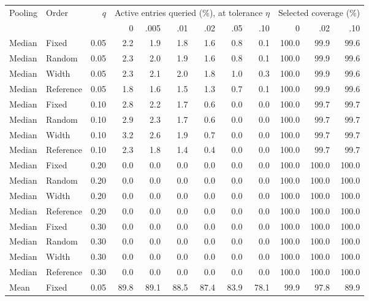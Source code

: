 \begin{table}[t]
\centering\small\setlength{\tabcolsep}{3pt}
\begin{tabular}{llrrrrrrrrrr}
\toprule
Pooling & Order & $q$ & \multicolumn{6}{c}{Active entries queried (\%), at tolerance $\eta$} & \multicolumn{3}{c}{Selected coverage (\%)} \\
\cmidrule(lr){4-9}\cmidrule(lr){10-12}
 & & & 0 & .005 & .01 & .02 & .05 & .10 & 0 & .02 & .10 \\
\midrule
Median & Fixed & 0.05 & 2.2 & 1.9 & 1.8 & 1.6 & 0.8 & 0.1 & 100.0 & 99.9 & 99.6 \\
Median & Random & 0.05 & 2.3 & 2.0 & 1.9 & 1.6 & 0.8 & 0.1 & 100.0 & 99.9 & 99.6 \\
Median & Width & 0.05 & 2.3 & 2.1 & 2.0 & 1.8 & 1.0 & 0.3 & 100.0 & 99.9 & 99.6 \\
Median & Reference & 0.05 & 1.8 & 1.6 & 1.5 & 1.3 & 0.7 & 0.1 & 100.0 & 99.9 & 99.6 \\
\addlinespace
Median & Fixed & 0.10 & 2.8 & 2.2 & 1.7 & 0.6 & 0.0 & 0.0 & 100.0 & 99.7 & 99.7 \\
Median & Random & 0.10 & 2.9 & 2.3 & 1.7 & 0.6 & 0.0 & 0.0 & 100.0 & 99.7 & 99.7 \\
Median & Width & 0.10 & 3.2 & 2.6 & 1.9 & 0.7 & 0.0 & 0.0 & 100.0 & 99.7 & 99.7 \\
Median & Reference & 0.10 & 2.3 & 1.8 & 1.4 & 0.4 & 0.0 & 0.0 & 100.0 & 99.7 & 99.7 \\
\addlinespace
Median & Fixed & 0.20 & 0.0 & 0.0 & 0.0 & 0.0 & 0.0 & 0.0 & 100.0 & 100.0 & 100.0 \\
Median & Random & 0.20 & 0.0 & 0.0 & 0.0 & 0.0 & 0.0 & 0.0 & 100.0 & 100.0 & 100.0 \\
Median & Width & 0.20 & 0.0 & 0.0 & 0.0 & 0.0 & 0.0 & 0.0 & 100.0 & 100.0 & 100.0 \\
Median & Reference & 0.20 & 0.0 & 0.0 & 0.0 & 0.0 & 0.0 & 0.0 & 100.0 & 100.0 & 100.0 \\
\addlinespace
Median & Fixed & 0.30 & 0.0 & 0.0 & 0.0 & 0.0 & 0.0 & 0.0 & 100.0 & 100.0 & 100.0 \\
Median & Random & 0.30 & 0.0 & 0.0 & 0.0 & 0.0 & 0.0 & 0.0 & 100.0 & 100.0 & 100.0 \\
Median & Width & 0.30 & 0.0 & 0.0 & 0.0 & 0.0 & 0.0 & 0.0 & 100.0 & 100.0 & 100.0 \\
Median & Reference & 0.30 & 0.0 & 0.0 & 0.0 & 0.0 & 0.0 & 0.0 & 100.0 & 100.0 & 100.0 \\
\addlinespace
\midrule
Mean & Fixed & 0.05 & 89.8 & 89.1 & 88.5 & 87.4 & 83.9 & 78.1 & 99.9 & 97.8 & 89.9 \\

\end{tabular}
\end{table}
